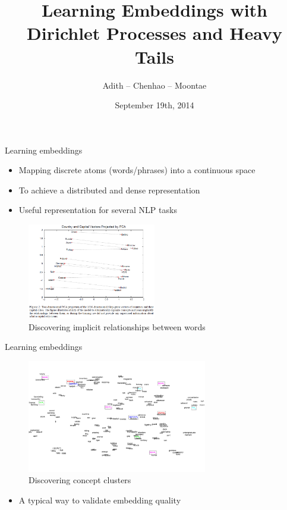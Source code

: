 \documentclass{beamer}
\title[ProbEmbed]{Learning Embeddings with Dirichlet Processes and Heavy Tails}
\author{Adith -- Chenhao -- Moontae}
\institute{Cornell}
\date{September 19th, 2014}
\begin{document}
\begin{frame}
\titlepage
\end{frame}

\begin{frame}{Learning embeddings}
  \begin{itemize}
    \item Mapping discrete atoms (words/phrases) into a continuous space
    \item To achieve a distributed and dense representation \cite{Hinton} 
    \item Useful representation for several NLP tasks \cite{Turian}
  \end{itemize}
 \vspace{-10px}
\begin{figure}[h!]
  \caption{Discovering implicit relationships between words \cite{CBOW}}
  \centering
    \includegraphics[width=0.5\textwidth]{CBOW.png}
\end{figure}
\end{frame}

\begin{frame}{Learning embeddings}
\begin{figure}[h!]
  \caption{Discovering concept clusters \cite{Socher}}
  \centering
    \includegraphics[width=0.7\textwidth]{MultipleVectorWordEmbedding.pdf}
\end{figure}
\begin{itemize}
    \item A typical way to validate embedding quality
\end{itemize}
\end{frame}
\end{document}

